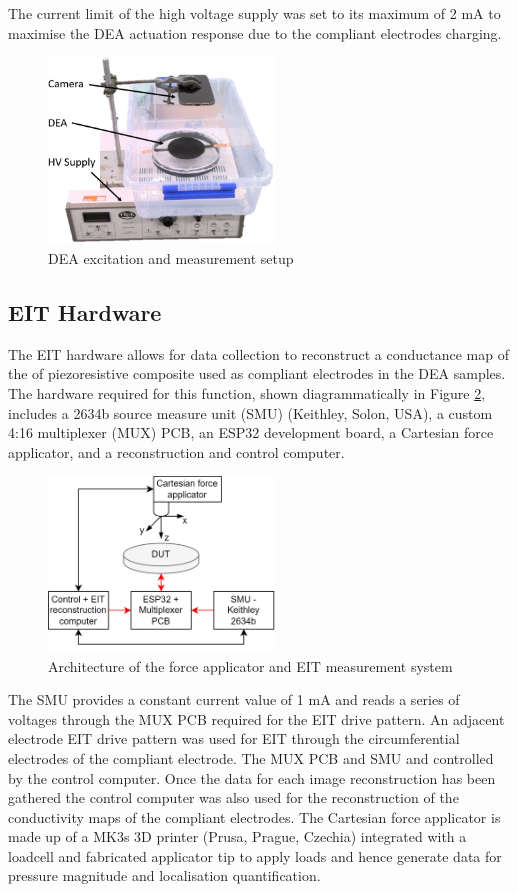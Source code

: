 The current limit of the high voltage supply was set to its maximum of 2 mA to maximise the DEA actuation response due to the compliant electrodes charging.
\begin{figure}[H]
	\centering
	\includegraphics[width=6cm]{Figures/HV_DEA_setup_labelled.jpg}
	\vspace{0.2cm}
	\caption{DEA excitation and measurement setup}
	\label{fig:HV_DEA_setup}
\end{figure}


\subsection{EIT Hardware}
\label{subsec:eit_hw}
The EIT hardware allows for data collection to reconstruct a conductance map of the of piezoresistive composite used as compliant electrodes in the DEA samples. The hardware required for this function, shown diagrammatically in Figure \ref{fig:ERT_MUX_CFA}, includes a 2634b source measure unit (SMU) (Keithley, Solon, USA), a custom 4:16 multiplexer (MUX) PCB, an ESP32 development board, a Cartesian force applicator, and a reconstruction and control computer. 
\begin{figure}[H]
	\centering
	\includegraphics[width=6cm]{Figures/ERT_MUX_CFA_architecture.jpg}
	\vspace{0.2cm}
	\caption{Architecture of the force applicator and EIT measurement system \cite{Ellingham2024}}
	\label{fig:ERT_MUX_CFA}
\end{figure}
The SMU provides a constant current value of 1 mA and reads a series of voltages through the MUX PCB required for the EIT drive pattern. An adjacent electrode EIT drive pattern was used for EIT through the circumferential electrodes of the compliant electrode. The MUX PCB and SMU and controlled by the control computer. Once the data for each image reconstruction has been gathered the control computer was also used for the reconstruction of the conductivity maps of the compliant electrodes. The Cartesian force applicator is made up of a MK3s 3D printer (Prusa, Prague, Czechia) integrated with a loadcell and fabricated applicator tip to apply loads and hence generate data for pressure magnitude and localisation quantification.


